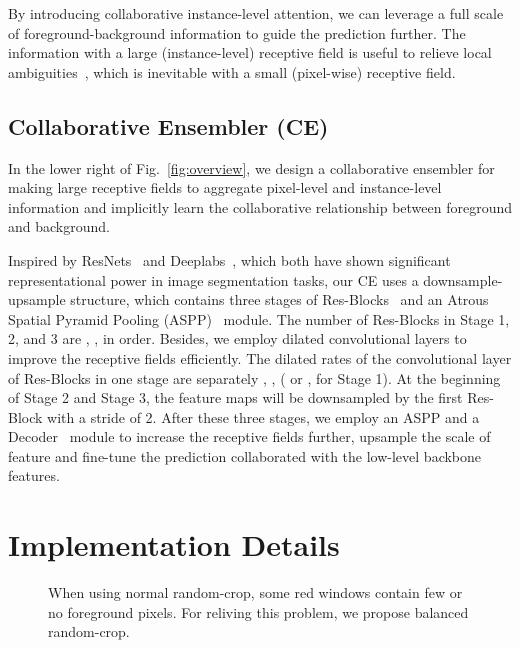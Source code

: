 \documentclass[runningheads]{llncs}
\begin{document}
By introducing collaborative instance-level attention, we can leverage a full scale of foreground-background information to guide the prediction further. The information with a large (instance-level) receptive field is useful to relieve local ambiguities~\cite{torralba2003contextual}, which is inevitable with a small (pixel-wise) receptive field.





\subsection{Collaborative Ensembler (CE)}

In the lower right of Fig.~\ref{fig:overview}, we design a collaborative ensembler for making large receptive fields to aggregate pixel-level and instance-level information and implicitly learn the collaborative relationship between foreground and background. 

Inspired by ResNets~\cite{resnet} and Deeplabs~\cite{deeplab,deeplabv3p}, which both have shown significant representational power in image segmentation tasks, our CE uses a downsample-upsample structure, which contains three stages of Res-Blocks~\cite{resnet} and an Atrous Spatial Pyramid Pooling (ASPP)~\cite{deeplabv3p} module. The number of Res-Blocks in Stage 1, 2, and 3 are , ,  in order. Besides, we employ dilated convolutional layers to improve the receptive fields efficiently. The dilated rates of the  convolutional layer of Res-Blocks in one stage are separately , ,  ( or ,  for Stage 1). At the beginning of Stage 2 and Stage 3, the feature maps will be downsampled by the first Res-Block with a stride of 2. After these three stages, we employ an ASPP and a Decoder~\cite{deeplabv3p} module to increase the receptive fields further, upsample the scale of feature and fine-tune the prediction collaborated with the low-level backbone features.



\section{Implementation Details}
\setlength{\intextsep}{-10pt}
\begin{wrapfigure}[11]{r}{0.5\textwidth}
\center\vspace{-9mm}


\caption{When using normal random-crop, some red windows contain few or no foreground pixels. For reliving this problem, we propose balanced random-crop.}\label{fig:crop}

\end{wrapfigure}
\end{document}
